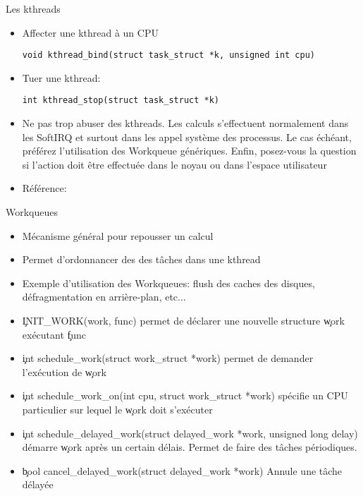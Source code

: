 \begin{frame}[fragile=singleslide]{Les kthreads}
  \begin{itemize}
  \item Affecter une kthread à un CPU
    \begin{lstlisting}
void kthread_bind(struct task_struct *k, unsigned int cpu)
    \end{lstlisting}
  \item Tuer une kthread:
    \begin{lstlisting}
int kthread_stop(struct task_struct *k)
    \end{lstlisting}
  \item  Ne pas  trop abuser  des kthreads.  Les  calculs s'effectuent
    normalement dans les SoftIRQ et surtout dans les appel système des
    processus.  Le cas échéant,  préférez l'utilisation  des Workqueue
    génériques. Enfin,  posez-vous la  question si l'action  doit être
    effectuée dans le noyau ou dans l'espace utilisateur
  \item Référence: 
  \end{itemize}
\end{frame}

\begin{frame}[fragile=singleslide]{Workqueues}
  \begin{itemize}
  \item Mécanisme général pour repousser un calcul
  \item Permet d'ordonnancer des des tâches dans une kthread
  \item  Exemple d'utilisation  des Workqueues:  flush des  caches des
    disques, défragmentation en arrière-plan, etc...
  \item  \c{INIT_WORK(work,  func)} permet  de  déclarer une  nouvelle
    structure \c{work} exécutant \c{func}
  \item \c{int schedule_work(struct work_struct *work)} permet de
    demander l'exécution de \c{work}
  \item  \c{int schedule_work_on(int  cpu, struct  work_struct *work)}
    spécifie un CPU particulier sur lequel le \c{work} doit s'exécuter
  \item
    \c{int schedule_delayed_work(struct delayed_work *work, unsigned long delay)}
    démarre \c{work} après un certain délais. Permet de faire des
    tâches périodiques.
  \item \c{bool cancel_delayed_work(struct delayed_work *work)} Annule
    une tâche délayée
  \end{itemize}
\end{frame}

